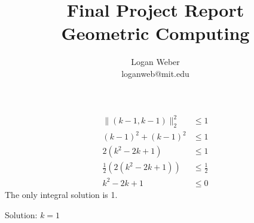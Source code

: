 \documentclass{article}
\begin{document}
\title{%
  Final Project Report
  \\[0.5em]
  \large Geometric Computing \\
}

\author{
Logan Weber\\
loganweb@mit.edu
}

\def\aSigma{\overline{\Sigma}}
\def\asigma{\overline{\sigma}}
\def\aheap{\overline{h}}

\date{}

\maketitle

\begin{align*}
  \| (k - 1, k-1) \|_2^2 &\leq 1 \\
  (k-1)^2 + (k-1)^2 & \leq 1 \\
  2(k^2 - 2k + 1) &\leq 1 \\
  \frac{1}{2}(2(k^2 - 2k + 1)) &\leq \frac{1}{2} \\
  k^2 - 2k + 1 &\leq 0
\end{align*}
The only integral solution is 1.

Solution: $k=1$




\end{document}
